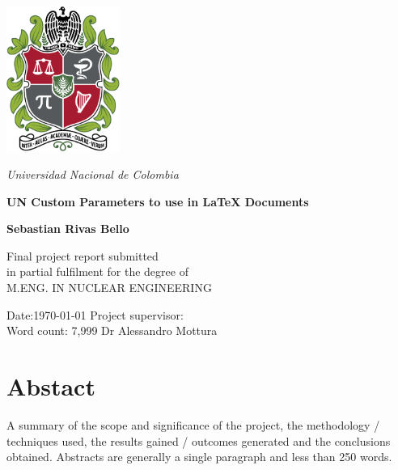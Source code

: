 \documentclass[12pt, letterpaper]{memoir}
\begin{document}



\onehalfspacing

\begin{center}
\includegraphics[width=10em]{Pics/UN_Shield.pdf}

\vspace{0.2in}
{\Large \textit{\color{UNBlueS}Universidad Nacional de Colombia}}

\vspace{0.8in}

{\Huge \textbf{\color{UNRed2}UN Custom Parameters to use in \LaTeX{} Documents } }

\vspace{0.5in}

{\Large \textbf{\color{UNBlack}Sebastian Rivas Bello}}

\vspace{1.2in}
Final project report submitted\\ 
in partial fulfilment for the degree of\\
M.ENG. IN NUCLEAR ENGINEERING
\end{center}

\vfill{}

Date:\today{}     \hfill{} Project supervisor: \\
Word count: 7,999   \hfill{} Dr Alessandro Mottura



\chapter*{Abstact}
A summary of the scope and significance of the project, the methodology / techniques used, the results gained / outcomes generated and the conclusions obtained. Abstracts are generally a single paragraph and less than 250 words.
\end{document}
